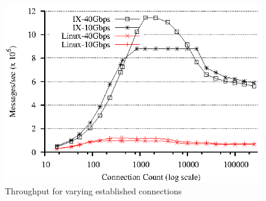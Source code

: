 
\begin{figure}
\begin{centering}
\includegraphics{figs/connscaling-throughput.eps}
\caption{Throughput for varying established connections}
\label{fig:connscaling}
\end{centering}
\end{figure}

